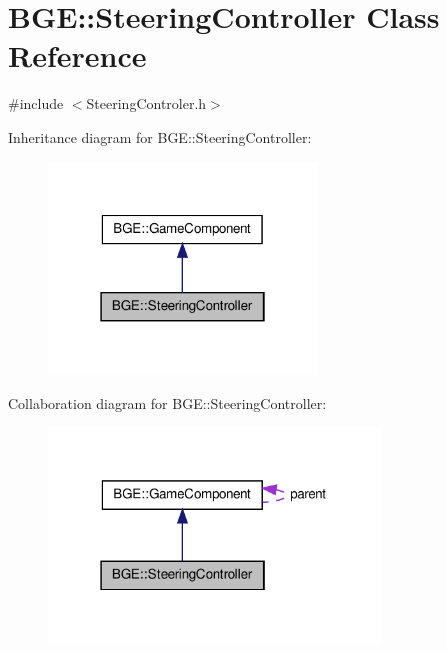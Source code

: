 \hypertarget{class_b_g_e_1_1_steering_controller}{\section{B\-G\-E\-:\-:Steering\-Controller Class Reference}
\label{class_b_g_e_1_1_steering_controller}
}


{\ttfamily \#include $<$Steering\-Controler.\-h$>$}



Inheritance diagram for B\-G\-E\-:\-:Steering\-Controller\-:
\nopagebreak
\begin{figure}[H]
\begin{center}
\leavevmode
\includegraphics[width=202pt]{class_b_g_e_1_1_steering_controller__inherit__graph}
\end{center}
\end{figure}


Collaboration diagram for B\-G\-E\-:\-:Steering\-Controller\-:
\nopagebreak
\begin{figure}[H]
\begin{center}
\leavevmode
\includegraphics[width=250pt]{class_b_g_e_1_1_steering_controller__coll__graph}
\end{center}
\end{figure}
